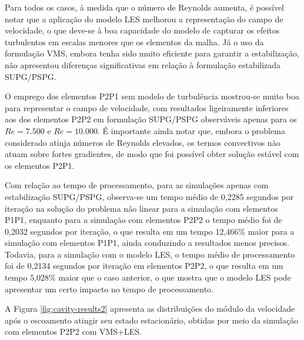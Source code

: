 Para todos os casos, à medida que o número de Reynolds aumenta, é possível notar que a aplicação do modelo LES melhorou a representação do campo de velocidade, o que deve-se à boa capacidade do modelo de capturar os efeitos turbulentos em escalas menores que os elementos da malha. Já o uso da formulação VMS, embora tenha sido muito eficiente para garantir a estabilização, não apresentou diferenças significativas em relação à formulação estabilizada SUPG/PSPG.

O emprego dos elementos P2P1 sem modelo de turbulência mostrou-se muito boa para representar o campo de velocidade, com resultados ligeiramente inferiores aos dos elementos P2P2 em formulação SUPG/PSPG observáveis apenas para os $Re=7.500$ e $Re=10.000$. É importante ainda notar que, embora o problema considerado atinja números de Reynolds elevados, os termos convectivos não atuam sobre fortes gradientes, de modo que foi possível obter solução estável com os elementos P2P1.

Com relação ao tempo de processamento, para as simulações apenas com estabilização SUPG/PSPG, observa-se um tempo médio de 0,2285 segundos por iteração na solução do problema não linear para a simulação com elementos P1P1, enquanto para a simulação com elementos P2P2 o tempo médio foi de 0,2032 segundos por iteração, o que resulta em um tempo 12,466\% maior para a simulação com elementos P1P1, ainda conduzindo a resultados menos precisos. Todavia, para a simulação com o modelo LES, o tempo médio de processamento foi de 0,2134 segundos por iteração em elementos P2P2, o que resulta em um tempo 5,028\% maior que o caso anterior, o que mostra que o modelo LES pode apresentar um certo impacto no tempo de processamento.

A Figura \ref{fig:cavity-results2} apresenta as distribuições do módulo da velocidade após o escoamento atingir seu estado estacionário, obtidas por meio da simulação com elementos P2P2 com VMS+LES.

